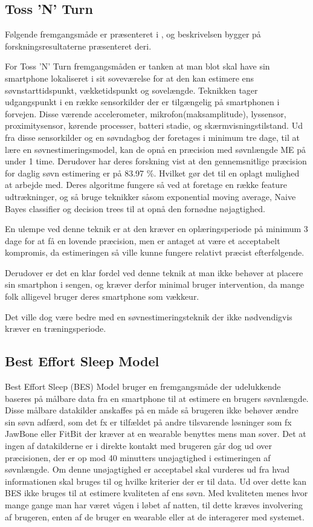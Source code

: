 \subsection{Toss 'N' Turn}
Følgende fremgangsmåde er præsenteret i \citet{Min:2014:TNT:2556288.2557220}, og beskrivelsen bygger på forskningsresultaterne præsenteret deri.

For Toss 'N' Turn fremgangsmåden er tanken at man blot skal have sin smartphone lokaliseret i sit soveværelse for at den kan estimere ens søvnstarttidspunkt, vækketidspunkt og sovelængde.
Teknikken tager udgangspunkt i en række sensorkilder der er tilgængelig på smartphonen i forvejen.
Disse værende accelerometer, mikrofon(maksamplitude), lyssensor, proximitysensor, kørende processer, batteri stadie, og skærmvisningstilstand.
Ud fra disse sensorkilder og en søvndagbog der foretages i minimum tre dage, til at lære en søvnestimeringsmodel, kan de opnå en præcision med søvnlængde ME på under 1 time.
Derudover har deres forskning vist at den gennemsnitlige præcision for daglig søvn estimering er på 83.97 \%. Hvilket gør det til en oplagt mulighed at arbejde med.
Deres algoritme fungere så ved at foretage en række feature udtrækninger, og så bruge teknikker såsom exponential moving average, Naive Bayes classifier og decision trees til at opnå den fornødne nøjagtighed.

En ulempe ved denne teknik er at den kræver en oplæringsperiode på minimum 3 dage for at få en lovende præcision, men er antaget at være et acceptabelt kompromis, da estimeringen så ville kunne fungere relativt præcist efterfølgende.

Derudover er det en klar fordel ved denne teknik at man ikke behøver at placere sin smartphon i sengen, og kræver derfor minimal bruger intervention, da mange folk alligevel bruger deres smartphone som vækkeur.

Det ville dog være bedre med en søvnestimeringsteknik der ikke nødvendigvis kræver en træningsperiode.

\subsection{Best Effort Sleep Model}\label{sec:BES}
Best Effort Sleep (BES) Model \citep{6563918} bruger en fremgangsmåde der udelukkende baseres på målbare data fra en smartphone til at estimere en brugers søvnlængde.
Disse målbare datakilder anskaffes på en måde så brugeren ikke behøver ændre sin søvn adfærd, som det fx er tilfældet på andre tilsvarende løsninger som fx JawBone eller FitBit der kræver at en wearable benyttes mens man sover.
Det at ingen af datakilderne er i direkte kontakt med brugeren går dog ud over præcisionen, der er op mod 40 minutters unøjagtighed i estimeringen af søvnlængde.
Om denne unøjagtighed er acceptabel skal vurderes ud fra hvad informationen skal bruges til og hvilke kriterier der er til data.
Ud over dette kan BES ikke bruges til at estimere kvaliteten af ens søvn.
Med kvaliteten menes hvor mange gange man har været vågen i løbet af natten, til dette kræves involvering af brugeren, enten af de bruger en wearable eller at de interagerer med systemet.

